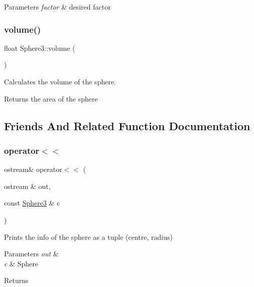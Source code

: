 \begin{DoxyParams}{Parameters}
{\em factor} & desired factor \\
\hline
\end{DoxyParams}
\mbox{\label{class_sphere3_af89fd0ff023ebedc783e9740554b32d7}} 
\subsubsection{\texorpdfstring{volume()}{volume()}}
{\footnotesize\ttfamily float Sphere3\+::volume (\begin{DoxyParamCaption}{ }\end{DoxyParamCaption})}



Calculates the volume of the sphere. 

\begin{DoxyReturn}{Returns}
the area of the sphere 
\end{DoxyReturn}


\subsection{Friends And Related Function Documentation}
\mbox{\label{class_sphere3_aa9adc2f852a9caf9692f1718f8d3a5c9}} 
\subsubsection{\texorpdfstring{operator$<$$<$}{operator<<}}
{\footnotesize\ttfamily ostream\& operator$<$$<$ (\begin{DoxyParamCaption}\item[{ostream \&}]{out,  }\item[{const \mbox{\hyperlink{class_sphere3}{Sphere3}} \&}]{c }\end{DoxyParamCaption})\hspace{0.3cm}{\ttfamily [friend]}}



Prints the info of the sphere as a tuple (centre, radius) 


\begin{DoxyParams}{Parameters}
{\em out} & \\
\hline
{\em c} & Sphere \\
\hline
\end{DoxyParams}
\begin{DoxyReturn}{Returns}

\end{DoxyReturn}


